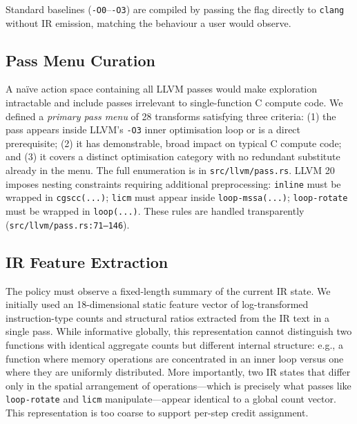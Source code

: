 \documentclass[conference]{IEEEtran}
\newcommand{\opt}[1]{\texttt{-O#1}}
\newcommand{\pass}[1]{\texttt{#1}}
\begin{document}
Standard baselines (\opt{0}--\opt{3}) are compiled by passing the flag
directly to \texttt{clang} without IR emission, matching the behaviour a
user would observe.

\subsection{Pass Menu Curation}
\label{sec:passmenu}
A na\"{i}ve action space containing all LLVM passes would make exploration
intractable and include passes irrelevant to single-function C compute code.
We defined a \emph{primary pass menu} of 28 transforms satisfying three
criteria: (1) the pass appears inside LLVM's \opt{3} inner optimisation loop
or is a direct prerequisite; (2) it has demonstrable, broad impact on typical
C compute code; and (3) it covers a distinct optimisation category with no
redundant substitute already in the menu.
The full enumeration is in \texttt{src/llvm/pass.rs}.
LLVM 20 imposes nesting constraints requiring additional preprocessing:
\pass{inline} must be wrapped in \texttt{cgscc(...)}; \pass{licm} must
appear inside \texttt{loop-mssa(...)}; \pass{loop-rotate} must be wrapped
in \texttt{loop(...)}. These rules are handled transparently
(\texttt{src/llvm/pass.rs:71--146}).

\subsection{IR Feature Extraction}
\label{sec:irfeatures}
The policy must observe a fixed-length summary of the current IR state.
We initially used an 18-dimensional static feature vector of
log-transformed instruction-type counts and structural ratios extracted
from the IR text in a single pass.
While informative globally, this representation cannot distinguish two
functions with identical aggregate counts but different internal structure:
e.g., a function where memory operations are concentrated in an inner loop
versus one where they are uniformly distributed.
More importantly, two IR states that differ only in the spatial arrangement
of operations---which is precisely what passes like \pass{loop-rotate} and
\pass{licm} manipulate---appear identical to a global count vector.
This representation is too coarse to support per-step credit assignment.
\end{document}
